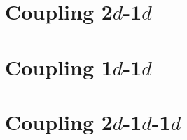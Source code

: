\documentclass[r]{siamart171218}
\begin{document}
\section{Coupling 2$d$-1$d$}\label{sec:problem_omega}


\section{Coupling 1$d$-1$d$}\label{sec:problem_gamma}


\section{Coupling 2$d$-1$d$-1$d$}\label{sec:coupled}





\end{document}
